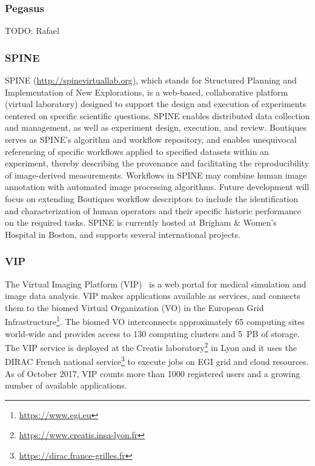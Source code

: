 \documentclass[a4paper,num-refs]{oup-contemporary}
\newcommand{\todo}[1]{\color{red}TODO: #1\color{black}}
\begin{document}
\subsubsection{Pegasus}
\todo{Rafael}

\subsubsection{SPINE}
SPINE (\url{http://spinevirtuallab.org}), which stands for Structured
Planning and Implementation of New Explorations, is a web-based,
collaborative platform (virtual laboratory) designed to support the
design and execution of experiments centered on specific scientific
questions.  SPINE enables distributed data collection and management,
as well as experiment design, execution, and review. Boutiques serves
as SPINE's algorithm and workflow repository, and enables unequivocal
referencing of specific workflows applied to specified datasets within
an experiment, thereby describing the provenance and facilitating the
reproducibility of image-derived measurements. Workflows in SPINE may
combine human image annotation with automated image processing
algorithms. Future development will focus on extending Boutiques
workflow descriptors to include the identification and
characterization of human operators and their specific historic
performance on the required tasks. SPINE is currently hosted at
Brigham \& Women's Hospital in Boston, and supports several
international projects.

\subsubsection{VIP}

The Virtual Imaging Platform (VIP)~\cite{GLAT-13} is a web portal for
medical simulation and image data analysis. VIP makes applications
available as services, and connects them to the biomed Virtual
Organization (VO) in the European Grid
Infrastructure\footnote{\url{https://www.egi.eu}}. The biomed VO
interconnects approximately 65 computing sites world-wide and provides
access to 130 computing clusters and 5~PB of storage.  The VIP service
is deployed at the Creatis
laboratory\footnote{\url{https://www.creatis.insa-lyon.fr}} in Lyon
and it uses the DIRAC French national
service\footnote{\url{https://dirac.france-grilles.fr}} to execute
jobs on EGI grid and cloud resources.  As of October 2017, VIP counts
more than 1000 registered users and a growing number of available
applications.
\end{document}
